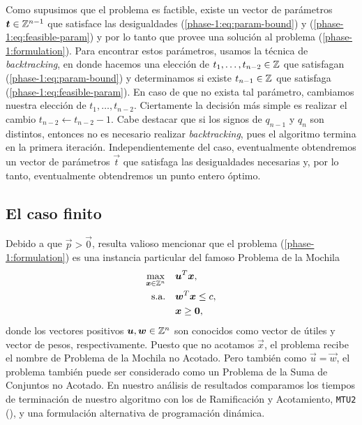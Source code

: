 Como supusimos que el problema es factible, existe un vector de parámetros $\boldsymbol{t} \in \mathbb{Z}^{n-1}$
que satisface las desigualdades (\ref{phase-1:eq:param-bound}) y (\ref{phase-1:eq:feasible-param}) y
por lo tanto que provee una solución al problema (\ref{phase-1:formulation}). Para encontrar estos
parámetros, usamos la técnica de \textit{backtracking}, en donde hacemos una elección de $t_1,
\ldots, t_{n-2} \in \mathbb{Z}$ que satisfagan (\ref{phase-1:eq:param-bound}) y determinamos si existe
$t_{n-1} \in \mathbb{Z}$ que satisfaga (\ref{phase-1:eq:feasible-param}). En caso de que no exista tal
parámetro, cambiamos nuestra elección de $t_1, \ldots, t_{n-2}$. Ciertamente la decisión más simple
es realizar el cambio $t_{n-2} \leftarrow t_{n-2} - 1$. Cabe destacar que si los signos de $q_{n-1}$
y $q_n$ son distintos, entonces no es necesario realizar \textit{backtracking}, pues el algoritmo
termina en la primera iteración. Independientemente del caso, eventualmente obtendremos un vector de
parámetros $\vec{t}$ que satisfaga las desigualdades necesarias y, por lo tanto, eventualmente
obtendremos un punto entero óptimo.

\subsection{El caso finito}
\noindent
Debido a que $\vec{p} > \vec{0}$, resulta valioso mencionar que el problema
(\ref{phase-1:formulation}) es una instancia particular del famoso Problema de la Mochila
\begin{subequations}
	\label{knapsack-formulation}
	\begin{align}
		\max_{\boldsymbol{x} \in \mathbb{Z}^n} \quad
			& \boldsymbol{u}^T\boldsymbol{x}, \\
		\text{s.a.} \quad
			& \boldsymbol{w}^T\boldsymbol{x} \leq c, \\
			& \boldsymbol{x} \geq \boldsymbol{0},
	\end{align}
\end{subequations}
donde los vectores positivos $\boldsymbol{u}, \boldsymbol{w} \in \mathbb{Z}^n$ son conocidos como vector de útiles y
vector de pesos, respectivamente. Puesto que no acotamos $\vec{x}$, el problema recibe el nombre de
Problema de la Mochila no Acotado. Pero también como $\vec{u} = \vec{w}$, el problema
también puede ser considerado como un Problema de la Suma de Conjuntos no Acotado. En nuestro análisis
de resultados comparamos los tiempos de terminación de nuestro algoritmo con los de Ramificación y
Acotamiento, \texttt{MTU2} (\cite{martello}), y una formulación alternativa de programación dinámica.

